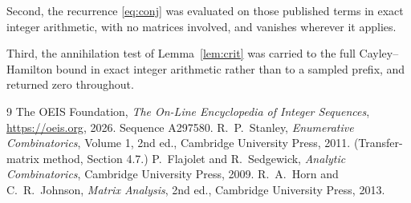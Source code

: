 \documentclass[11pt,a4paper]{article}
\theoremstyle{plain}
\theoremstyle{definition}
\begin{document}
Second, the recurrence \eqref{eq:conj} was evaluated on those published terms in exact
integer arithmetic, with no matrices involved, and vanishes wherever it applies.

Third, the annihilation test of Lemma~\ref{lem:crit} was carried to the full
Cayley--Hamilton bound in exact integer arithmetic rather than to a sampled prefix, and
returned zero throughout.

\begin{thebibliography}{9}
 The OEIS Foundation, \emph{The On-Line Encyclopedia of Integer
Sequences}, \url{https://oeis.org}, 2026. Sequence A297580.
 R.~P.~Stanley, \emph{Enumerative Combinatorics}, Volume 1, 2nd ed.,
Cambridge University Press, 2011. (Transfer-matrix method, Section 4.7.)
 P.~Flajolet and R.~Sedgewick, \emph{Analytic Combinatorics}, Cambridge
University Press, 2009.
 R.~A.~Horn and C.~R.~Johnson, \emph{Matrix Analysis}, 2nd ed., Cambridge
University Press, 2013.
\end{thebibliography}
\end{document}
